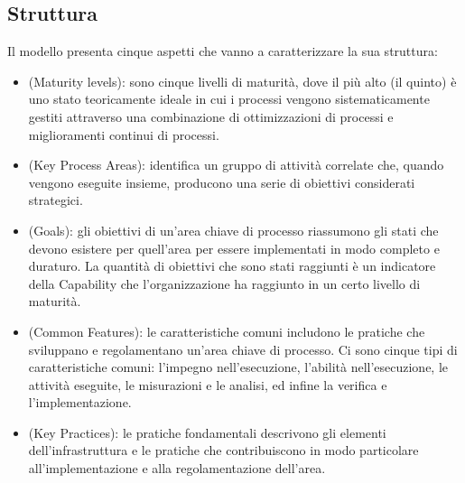\documentclass[a4paper, titlepage]{article}
\begin{document}
\subsection {Struttura}
Il modello  presenta cinque aspetti che vanno a caratterizzare la sua struttura:
\begin{itemize}
\item {} (Maturity levels): sono cinque livelli di maturità, dove il più alto (il quinto) è uno stato teoricamente ideale in cui i processi vengono sistematicamente gestiti attraverso una combinazione di ottimizzazioni di processi e miglioramenti continui di processi.
\\
\item {} (Key Process Areas): identifica un gruppo di attività correlate che, quando vengono eseguite insieme, producono una serie di obiettivi considerati strategici.
\\
\item {} (Goals): gli obiettivi di un’area chiave di processo riassumono gli stati che devono esistere per quell’area per essere implementati in modo completo e duraturo. La quantità di obiettivi che sono stati raggiunti è un indicatore della Capability che l’organizzazione ha raggiunto in un certo livello di maturità.
\\
\item {} (Common Features): le caratteristiche comuni includono le pratiche che sviluppano e regolamentano un’area chiave di processo. Ci sono cinque tipi di caratteristiche comuni: l’impegno nell’esecuzione, l’abilità nell’esecuzione, le attività eseguite, le misurazioni e le analisi, ed infine la verifica e l’implementazione.
\\
\item {} (Key Practices): le pratiche fondamentali descrivono gli elementi dell’infrastruttura e le pratiche che contribuiscono in modo particolare all’implementazione e alla regolamentazione dell’area.
\end{itemize}
\end{document}
